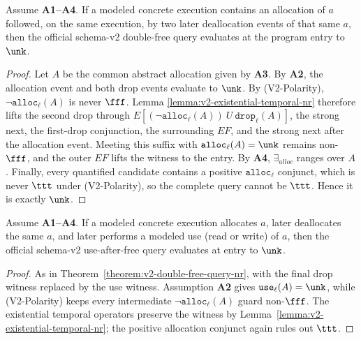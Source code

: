 \begin{theorem}
\label{theorem:v2-double-free-query-nr}
Assume \textbf{A1--A4}. If a modeled concrete execution contains an allocation
of $a$ followed, on the same execution, by two later deallocation events of
that same $a$, then the official schema-v2 double-free query evaluates at the
program entry to $\unk$.
\end{theorem}
\begin{proof}
Let $A$ be the common abstract allocation given by \textbf{A3}. By \textbf{A2},
the allocation event and both drop events evaluate to $\unk$. By
(V2-Polarity), $\neg\texttt{alloc}_\ell(A)$ is never $\fff$. Lemma
\ref{lemma:v2-existential-temporal-nr} therefore lifts the second drop through
$E[(\neg\texttt{alloc}_\ell(A))\ U\ \texttt{drop}_\ell(A)]$, the strong next,
the first-drop conjunction, the surrounding $EF$, and the strong next after
the allocation event. Meeting this suffix with
$\texttt{alloc}_\ell(A)=\unk$ remains non-$\fff$, and the outer $EF$ lifts the
witness to the entry. By \textbf{A4}, $\exists_{alloc}$ ranges over $A$.
Finally, every quantified candidate contains a positive
$\texttt{alloc}_\ell$ conjunct, which is never $\ttt$ under (V2-Polarity), so
the complete query cannot be $\ttt$. Hence it is exactly $\unk$.
\end{proof}

\begin{theorem}
\label{theorem:v2-uaf-query-nr}
Assume \textbf{A1--A4}. If a modeled concrete execution allocates $a$, later
deallocates the same $a$, and later performs a modeled use (read or write) of
$a$, then the official schema-v2 use-after-free query evaluates at entry to
$\unk$.
\end{theorem}
\begin{proof}
As in Theorem~\ref{theorem:v2-double-free-query-nr}, with the final drop witness
replaced by the use witness.  Assumption \textbf{A2} gives
$\texttt{use}_\ell(A)=\unk$, while (V2-Polarity) keeps every intermediate
$\neg\texttt{alloc}_\ell(A)$ guard non-$\fff$.  The existential temporal
operators preserve the witness by
Lemma~\ref{lemma:v2-existential-temporal-nr}; the positive allocation conjunct
again rules out $\ttt$.
\end{proof}

